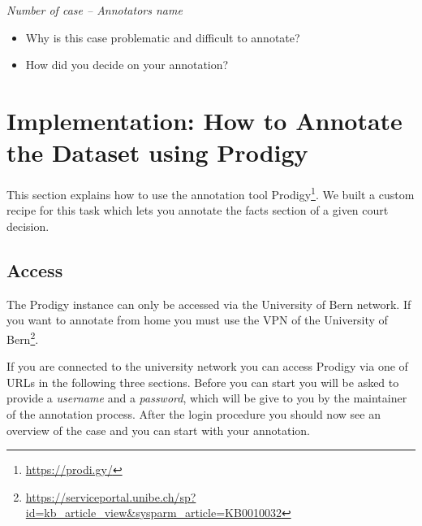 \documentclass{article}
\begin{document}
\begin{mdframed}[frametitle={Comment for generally problematic case}]
\emph{Number of case – Annotators name}

\begin{itemize}
	\item Why is this case problematic and difficult to annotate?

\item How did you decide on your annotation?
\end{itemize}
\end{mdframed}

\section{Implementation: How to Annotate the Dataset using Prodigy}
This section explains how to use the annotation tool Prodigy\footnote{\href{https://prodi.gy/}{https://prodi.gy/}}. We built a custom recipe for this task which lets you annotate the facts section of a given court decision.

\subsection{Access}
The Prodigy instance can only be accessed via the University of Bern network. If you want to annotate from home you must use the VPN of the University of Bern\footnote{\href{https://serviceportal.unibe.ch/sp?id=kb_article_view&sysparm_article=KB0010032}{https://serviceportal.unibe.ch/sp?id=kb_article_view&sysparm_article=KB0010032}}.

If you are connected to the university network you can access Prodigy via one of URLs in the following three sections. Before you can start you will be asked to provide a \emph{username} and a \emph{password}, which will be give to you by the maintainer of the annotation process. After the login procedure you should now see an overview of the case and you can start with your annotation.
\end{document}
